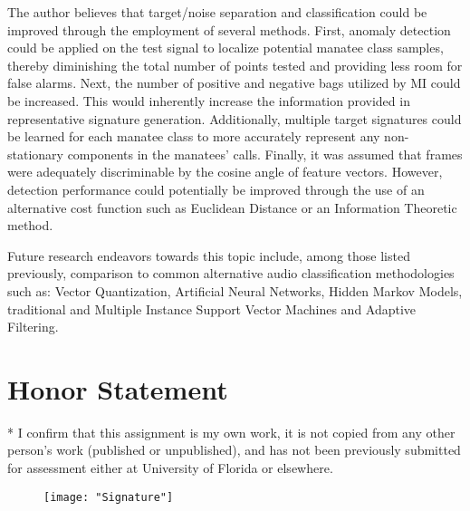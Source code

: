\documentclass[conference]{IEEEtran}
\begin{document}
The author believes that target/noise separation and classification could be improved through the employment of several methods.  First, anomaly detection could be applied on the test signal to localize potential manatee class samples, thereby diminishing the total number of points tested and providing less room for false alarms.  Next, the number of positive and negative bags utilized by MI could be increased.  This would inherently increase the information provided in representative signature generation.  Additionally, multiple target signatures could be learned for each manatee class to more accurately represent any non-stationary components in the manatees' calls. Finally,  it was assumed that frames were adequately discriminable by the cosine angle of feature vectors.  However, detection performance could potentially be improved through the use of an alternative cost function such as Euclidean Distance or an Information Theoretic method.

Future research endeavors towards this topic include, among those listed previously, comparison to common alternative audio classification methodologies such as: Vector Quantization, Artificial Neural Networks, Hidden Markov Models, traditional and Multiple Instance Support Vector Machines and Adaptive Filtering.

\section*{Honor Statement}
\noindent
* I confirm that this assignment is my own work, it is not copied from any other person's work (published or unpublished), and has not been previously submitted for assessment either at University of Florida or elsewhere.

\begin{figure}[h!]
	\centering
	\texttt{[image: "Signature"]}
\end{figure}
\end{document}
